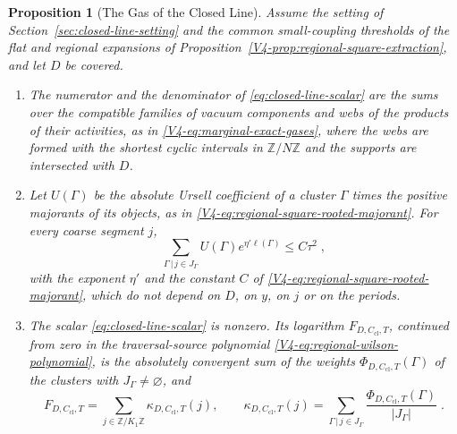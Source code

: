 \documentclass[11pt]{article}
\numberwithin{equation}{section}
\newtheorem{proposition}[theorem]{Proposition}
\theoremstyle{remark}
\theoremstyle{plain}
\begin{document}
\begin{proposition}[The Gas of the Closed Line]\label{prop:closed-line-gas}
Assume the setting of Section~\ref{sec:closed-line-setting} and the common small-coupling thresholds of the flat and regional expansions of Proposition~\ref{V4-prop:regional-square-extraction}, and let $D$ be covered.
\begin{enumerate}[label=(\roman*)]
    \item The numerator and the denominator of \eqref{eq:closed-line-scalar} are the sums over the compatible families of vacuum components and webs of the products of their activities, as in \eqref{V4-eq:marginal-exact-gases}, where the webs are formed with the shortest cyclic intervals in $\mathbb Z/N\mathbb Z$ and the supports are intersected with $D$.
    \item Let $U(\Gamma)$ be the absolute Ursell coefficient of a cluster $\Gamma$ times the positive majorants of its objects, as in \eqref{V4-eq:regional-square-rooted-majorant}. For every coarse segment $j$,
    \begin{equation}\label{eq:closed-line-rooted-majorant}
        \sum_{\Gamma\, | \,j\in J_{\Gamma}}U(\Gamma)e^{\eta'\ell(\Gamma)}\leqslant C\tau^2\;,
    \end{equation}
    with the exponent $\eta'$ and the constant $C$ of \eqref{V4-eq:regional-square-rooted-majorant}, which do not depend on $D$, on $y$, on $j$ or on the periods.
    \item The scalar \eqref{eq:closed-line-scalar} is nonzero. Its logarithm $F_{D,C_{\mathrm{cl}},T}$, continued from zero in the traversal-source polynomial \eqref{V4-eq:regional-wilson-polynomial}, is the absolutely convergent sum of the weights $\Phi_{D,C_{\mathrm{cl}},T}(\Gamma)$ of the clusters with $J_{\Gamma}\neq\varnothing$, and
    \begin{equation}\label{eq:closed-line-allocation}
        F_{D,C_{\mathrm{cl}},T}=\sum_{j\in\mathbb Z/K_1\mathbb Z}\kappa_{D,C_{\mathrm{cl}},T}(j),
        \qquad
        \kappa_{D,C_{\mathrm{cl}},T}(j)=\sum_{\Gamma\, | \,j\in J_{\Gamma}}\frac{\Phi_{D,C_{\mathrm{cl}},T}(\Gamma)}{| J_{\Gamma}|}\;.
    \end{equation}
\end{enumerate}
\end{proposition}
\end{document}
